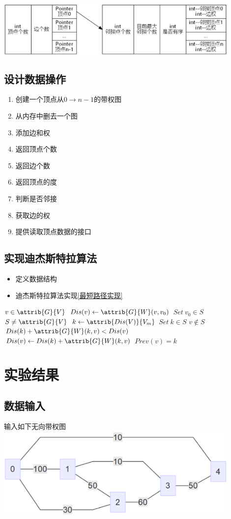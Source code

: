 \documentclass[a4paper,10pt]{ctexart}
\begin{document}
\includegraphics[width=0.9\textwidth]{DataStruct.eps}

\subsection{设计数据操作}
\begin{enumerate}
  \item 创建一个顶点从$0 \to n-1$的带权图
  \item 从内存中删去一个图
  \item 添加边和权
  \item 返回顶点个数
  \item 返回边个数
  \item 返回顶点的度
  \item 判断是否邻接
  \item 获取边的权
  \item 提供读取顶点数据的接口
\end{enumerate}

\subsection{实现迪杰斯特拉算法}
\begin{itemize}
  \item 定义数据结构
  \item 迪杰斯特拉算法实现\ref{最短路径实现}
\end{itemize}
\begin{codebox}
\li \For $v \in \attrib{G}{V}$
    \Do
\li     $Dis(v) \gets \attrib{G}{W}(v,v_0)$
    \End
\li $Set \  v_0 \in S$
\li \While $S \ne \attrib{G}{V}$
    \Do
\li     $k \gets \attrib{Dis(V)}{V_m}$
\li     $Set \  k \in S$
\li     \For $v \notin S$
        \Do
\li        \If $Dis(k) + \attrib{G}{W}(k,v) < Dis(v)$
\li        \Then $Dis(v) \gets Dis(k) + \attrib{G}{W}(k,v)$
\li        $Prev(v) = k $
        \End
    \End
\end{codebox}
\section{实验结果}
\subsection{数据输入}
输入如下无向带权图\\
\includegraphics[width=0.9\textwidth]{Test.eps}
\end{document}
